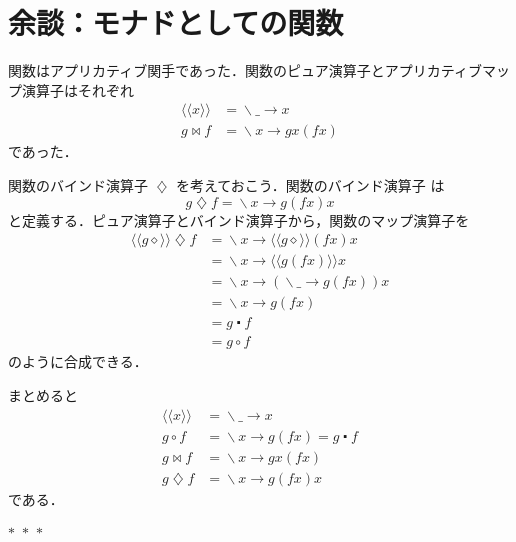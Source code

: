 \documentclass[a5paper,twoside,fleqn]{jsbook}
\newcommand{\Langle}{\langle\!\langle}
\newcommand{\Rangle}{\rangle\!\rangle}
\newcommand{\separator}{\begin{center}$*$~$*$~$*$\end{center}}
\newcommand{\mAnyParam}{\_}
\newcommand{\mAnonParam}{\diamond}
\DeclareMathOperator{\mAppMapFunc}{\bowtie}
\DeclareMathOperator{\mBindFunc}{\diamondsuit}
\DeclareMathOperator{\mComp}{\centerdot}
\DeclareMathOperator{\mLambda}{\backslash}
\DeclareMathOperator{\mLambdaArrow}{\rightarrow}
\DeclareMathOperator{\mMapFunc}{\circ}
\newcommand{\mFuncWith}[1]{\Langle#1\Rangle}
\newcommand{\mLambdaExp}[2]{\mLambda{#1}\mLambdaArrow{#2}}
\begin{document}
\section{余談：モナドとしての関数}

関数はアプリカティブ関手であった．関数のピュア演算子とアプリカティブマッ
プ演算子はそれぞれ
\begin{align}
\mFuncWith{x}&=\mLambdaExp{\mAnyParam}{x}\\
g\mAppMapFunc f&=\mLambdaExp{x}{gx(fx)}
\end{align}
であった．

関数のバインド演算子 $\mBindFunc$ を考えておこう．関数のバインド演算子
は
\begin{equation}
g\mBindFunc f=\mLambdaExp{x}{g(fx)x}
\end{equation}
と定義する．ピュア演算子とバインド演算子から，関数のマップ演算子を
\begin{align}
\mFuncWith{g\mAnonParam}\mBindFunc f
&=\mLambdaExp{x}{\mFuncWith{g\mAnonParam}(fx)x}\\
&=\mLambdaExp{x}{\mFuncWith{g(fx)}x}\\
&=\mLambdaExp{x}{(\mLambdaExp{\mAnyParam}{g(fx)})x}\\
&=\mLambdaExp{x}{g(fx)}\\
&=g\mComp f\\
&=g\mMapFunc f
\end{align}
のように合成できる．

まとめると
\begin{align}
\mFuncWith{x}&=\mLambdaExp{\mAnyParam}{x}\\
g\mMapFunc f&=\mLambdaExp{x}{g(fx)}=g\mComp f\\
g\mAppMapFunc f&=\mLambdaExp{x}{gx(fx)}\\
g\mBindFunc f&=\mLambdaExp{x}{g(fx)x}
\end{align}
である．


\separator
\end{document}
